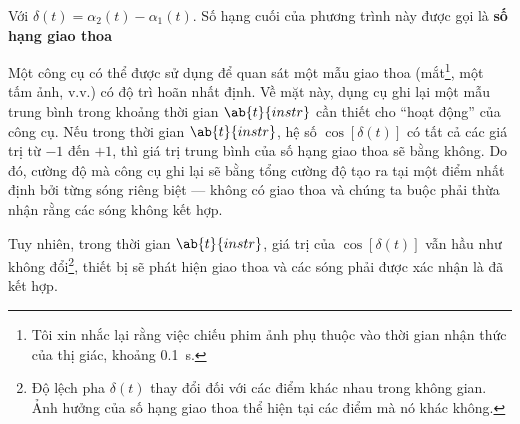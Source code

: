 \noindent
Với $\delta(t) = \alpha_2(t) - \alpha_1(t)$.
Số hạng cuối của phương trình này được gọi là \textbf{số hạng giao thoa}

Một công cụ có thể được sử dụng để quan sát một mẫu giao thoa (mắt\footnote{Tôi xin nhắc lại rằng việc chiếu phim ảnh phụ thuộc vào thời gian nhận thức của thị giác, khoảng \SI{0.1}{\second}.}, một tấm ảnh, v.v.) có độ trì hoãn nhất định.
Về mặt này, dụng cụ ghi lại một mẫu trung bình trong khoảng thời gian $\ab{t}{instr}$ cần thiết cho ``hoạt động'' của công cụ.
Nếu trong thời gian $\ab{t}{instr}$, hệ số $\cos[\delta(t)]$ có tất cả các giá trị từ $-1$ đến $+1$, thì giá trị trung bình của số hạng giao thoa sẽ bằng không.
Do đó, cường độ mà công cụ ghi lại sẽ bằng tổng cường độ tạo ra tại một điểm nhất định bởi từng sóng riêng biệt --- không có giao thoa và chúng ta buộc phải thừa nhận rằng các sóng không kết hợp.

Tuy nhiên, trong thời gian $\ab{t}{instr}$, giá trị của $\cos[\delta(t)]$ vẫn hầu như không đổi\footnote{Độ lệch pha $\delta(t)$ thay đổi đối với các điểm khác nhau trong không gian. Ảnh hưởng của số hạng giao thoa thể hiện tại các điểm mà nó khác không.}, thiết bị sẽ phát hiện giao thoa và các sóng phải được xác nhận là đã kết hợp.

